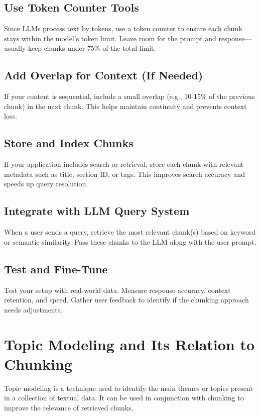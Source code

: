 \documentclass{article}
\begin{document}
\subsection{Use Token Counter Tools}

Since LLMs process text by tokens, use a token counter to ensure each chunk stays within the model's token limit. Leave room for the prompt and response—usually keep chunks under 75\% of the total limit.

\subsection{Add Overlap for Context (If Needed)}

If your content is sequential, include a small overlap (e.g., 10-15\% of the previous chunk) in the next chunk. This helps maintain continuity and prevents context loss.

\subsection{Store and Index Chunks}

If your application includes search or retrieval, store each chunk with relevant metadata such as title, section ID, or tags. This improves search accuracy and speeds up query resolution.

\subsection{Integrate with LLM Query System}

When a user sends a query, retrieve the most relevant chunk(s) based on keyword or semantic similarity. Pass these chunks to the LLM along with the user prompt.

\subsection{Test and Fine-Tune}

Test your setup with real-world data. Measure response accuracy, context retention, and speed. Gather user feedback to identify if the chunking approach needs adjustments.

\section{Topic Modeling and Its Relation to Chunking}

Topic modeling is a technique used to identify the main themes or topics present in a collection of textual data. It can be used in conjunction with chunking to improve the relevance of retrieved chunks.
\end{document}
